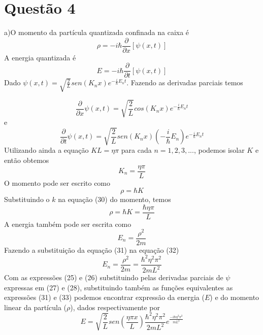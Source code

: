\documentclass{article}
\begin{document}
\section {Questão 4}
a)O momento da partícula quantizada confinada na caixa é
\begin{equation}
    {\rho = -i\hbar \frac{\partial}{\partial x}\left[ \psi(x,t)  \right]}
\end{equation}
A energia quantizada é
\begin{equation}
    {E = -i\hbar \frac{\partial}{\partial t}\left[ \psi(x,t)  \right]}
\end{equation}
Dado $\psi (x,t) = \sqrt{\frac{2}{L}}sen(K_n x)e^{-\frac{i}{\hbar}E_n t}$. Fazendo as derivadas parciais temos

\begin{equation}
    {\frac{\partial}{\partial x}\psi (x,t) = \sqrt{\frac{2}{L}}cos(K_n x)e^{-\frac{i}{\hbar}E_n t}}
\end{equation}
e
\begin{equation}
    {\frac{\partial}{\partial t}\psi (x,t) = \sqrt{\frac{2}{L}}sen(K_n x)(-\frac{i}{\hbar}E_n)e^{-\frac{i}{\hbar}E_n t}}
\end{equation}
Utilizando ainda a equação $KL = \eta \pi$ para cada $n=1,2,3,...$, podemos isolar $K$ e então obtemos
\begin{equation}
    {K_n = \frac{\eta \pi}{L}}
\end{equation}
O momento pode ser escrito como
\begin{equation}
    {\rho = \hbar K}
\end{equation}
Substituindo o $k$ na equação (30) do momento, temos
\begin{equation}
    {\rho = \hbar K = \frac{\hbar \eta \pi}{L}}
\end{equation}
A energia também pode ser escrita como
\begin{equation}
    {E_n = \frac{\rho ^{2}}{2m}}
\end{equation}
Fazendo a substituição da equação (31) na equação (32)
\begin{equation}
    {E_n = \frac{\rho ^{2}}{2m} = \frac{\hbar^{2}\eta^{2}\pi ^{2}}{2mL^{2}}}
\end{equation}
Com as expressões (25) e (26) substituindo pelas derivadas parciais de $\psi$ expressas em (27) e (28), substituindo também as funções equivalentes as expressões (31) e (33)  podemos encontrar expressão da energia ($E$) e do momento linear da partícula ($\rho$), dados respectivamente por
\begin{equation}
    {E =  \sqrt{\frac{2}{L}}sen(\frac{ \eta \pi x}{L})\frac{\hbar^{2}\eta^{2}\pi^{2}}{2mL^{2}}e^{\frac{-i\hbar\eta^{2}\pi ^{2}}{mL^{2}}}}
\end{equation}
\end{document}
